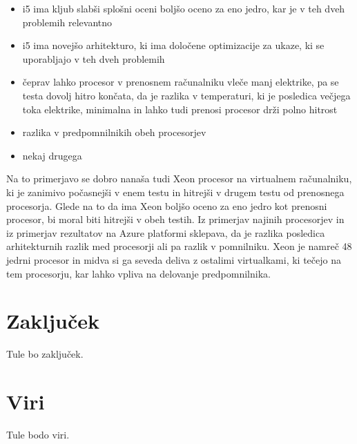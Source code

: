 \begin{itemize}
	\item i5 ima kljub slabši splošni oceni boljšo oceno za eno jedro, kar je v teh dveh problemih relevantno
	\item i5 ima novejšo arhitekturo, ki ima določene optimizacije za ukaze, ki se uporabljajo v teh dveh problemih
	\item čeprav lahko procesor v prenosnem računalniku vleče manj elektrike, pa se testa dovolj hitro končata, da je razlika v temperaturi, ki je posledica večjega toka elektrike, minimalna in lahko tudi prenosi procesor drži polno hitrost
	\item razlika v predpomnilnikih obeh procesorjev
	\item nekaj drugega
\end{itemize}

Na to primerjavo se dobro nanaša tudi Xeon procesor na virtualnem računalniku, ki je zanimivo počasnejši v enem testu in hitrejši v drugem testu od prenosnega procesorja. Glede na to da ima Xeon boljšo oceno za eno jedro kot prenosni procesor, bi moral biti hitrejši v obeh testih. Iz primerjav najinih procesorjev in iz primerjav rezultatov na Azure platformi sklepava, da je razlika posledica arhitekturnih razlik med procesorji ali pa razlik v pomnilniku. Xeon je namreč 48 jedrni procesor in midva si ga seveda deliva z ostalimi virtualkami, ki tečejo na tem procesorju, kar lahko vpliva na delovanje predpomnilnika.












\section{Zaključek}
Tule bo zaključek.

\section{Viri}
Tule bodo viri.
